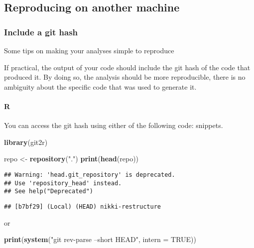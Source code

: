 \documentclass[]{book}
\newenvironment{Shaded}{\begin{snugshade}}{\end{snugshade}}
\newcommand{\DataTypeTok}[1]{\textcolor[rgb]{0.13,0.29,0.53}{#1}}
\newcommand{\KeywordTok}[1]{\textcolor[rgb]{0.13,0.29,0.53}{\textbf{#1}}}
\newcommand{\NormalTok}[1]{#1}
\newcommand{\OtherTok}[1]{\textcolor[rgb]{0.56,0.35,0.01}{#1}}
\newcommand{\StringTok}[1]{\textcolor[rgb]{0.31,0.60,0.02}{#1}}
\let\oldparagraph\paragraph
\renewcommand{\paragraph}[1]{\oldparagraph{#1}\mbox{}}
\begin{document}
\hypertarget{githash}{%
\subsection{Reproducing on another machine}\label{githash}}

\hypertarget{include-a-git-hash}{%
\subsubsection*{Include a git hash}\label{include-a-git-hash}}

Some tips on making your analyses simple to reproduce

If practical, the output of your code should include the git hash
of the code that produced it. By doing so, the analysis should be
more reproducible, there is no ambiguity about the specific code
that was used to generate it.

\hypertarget{r}{%
\paragraph{R}\label{r}}

You can access the git hash using either of the following code:
snippets.

\begin{Shaded}
\begin{Highlighting}[]
\KeywordTok{library}\NormalTok{(git2r)}

\NormalTok{repo <-}\StringTok{ }\KeywordTok{repository}\NormalTok{(}\StringTok{"."}\NormalTok{)}
\KeywordTok{print}\NormalTok{(}\KeywordTok{head}\NormalTok{(repo))}
\end{Highlighting}
\end{Shaded}

\begin{verbatim}
## Warning: 'head.git_repository' is deprecated.
## Use 'repository_head' instead.
## See help("Deprecated")
\end{verbatim}

\begin{verbatim}
## [b7bf29] (Local) (HEAD) nikki-restructure
\end{verbatim}

or

\begin{Shaded}
\begin{Highlighting}[]
\KeywordTok{print}\NormalTok{(}\KeywordTok{system}\NormalTok{(}\StringTok{"git rev-parse --short HEAD"}\NormalTok{, }\DataTypeTok{intern =} \OtherTok{TRUE}\NormalTok{))}
\end{Highlighting}
\end{Shaded}
\end{document}
